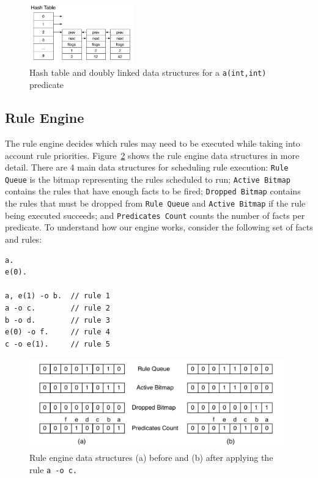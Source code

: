 \documentclass{sigplanconf}
\begin{document}
\begin{figure}[ht]
\centering
\includegraphics[width=0.4\textwidth]{figures/hash_table.pdf}
\caption{Hash table and doubly linked data structures for 
  a \texttt{a(int,int)} predicate}
\label{fig:hash_table}
\end{figure}


\subsection{Rule Engine}
\label{rule_engine}

The rule engine decides which rules may need to be executed while
taking into account rule priorities. Figure~\ref{fig:rule_engine}
shows the rule engine data structures in more detail. There are 4 main
data structures for scheduling rule execution: \texttt{Rule Queue} is
the bitmap representing the rules scheduled to run; \texttt{Active
Bitmap} contains the rules that have enough facts to be
fired; \texttt{Dropped Bitmap} contains the rules that must be dropped
from \texttt{Rule Queue} and \texttt{Active Bitmap} if the rule being
executed succeeds; and \texttt{Predicates Count} counts the number of
facts per predicate. To understand how our engine works, consider the
following set of facts and rules:

{\footnotesize
\begin{Verbatim}
a.
e(0).

a, e(1) -o b.  // rule 1
a -o c.        // rule 2
b -o d.        // rule 3
e(0) -o f.     // rule 4
c -o e(1).     // rule 5
\end{Verbatim}
}

\begin{figure}[t]
\centering
\includegraphics[width=11cm]{figures/rule_queue.pdf}
\caption{Rule engine data structures (a) before and (b) after applying 
  the rule \texttt{a -o c.}}
\label{fig:rule_engine}
\end{figure}
\end{document}

